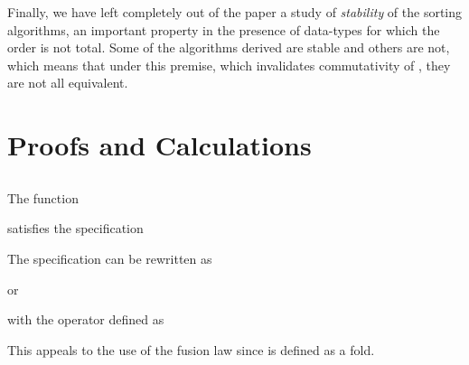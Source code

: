 \documentclass[a4paper,11pt]{llncs}
\begin{document}
Finally, we have left completely out of the paper a study of
\emph{stability} of the sorting algorithms, an important property in
the presence of data-types for which the order is not total. Some of
the algorithms derived are stable and others are not, which means that
under this premise, which invalidates commutativity of , they
are not all equivalent.


























\nocite{MeertensL:par}
\nocite{MeijerE:funpbleb}
























\newpage


\appendix

\section{Proofs and Calculations}


\subsection{}
\label{app:sec:isortCt}


The function

satisfies the specification



\proof
The specification can be rewritten as

or 

with the  operator defined as

This appeals to the use of the fusion law since  is defined
as a fold.

\endproof


\subsection{}
\label{app:sec:istLT}
\end{document}
